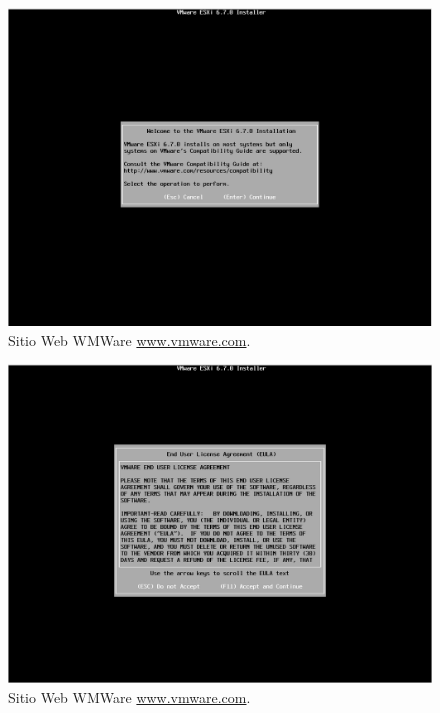 \begin{figure}[!hbtp]
	\centering
	\includegraphics[width=\linewidth]{RE01_VMwareESXi/RE_VMwareInstalacion05.png}
	\vspace{-0.2cm}
	\caption{Sitio Web WMWare \url{www.vmware.com}.\footnotemark[2]{} }
	\label{fig:VMwareInstalacion05}
\end{figure}

\begin{figure}[!hbtp]
	\centering
	\includegraphics[width=\linewidth]{RE01_VMwareESXi/RE_VMwareInstalacion06.png}
	\vspace{-0.2cm}
	\caption{Sitio Web WMWare \url{www.vmware.com}.\footnotemark[2]{} }
	\label{fig:VMwareInstalacion06}
\end{figure}



